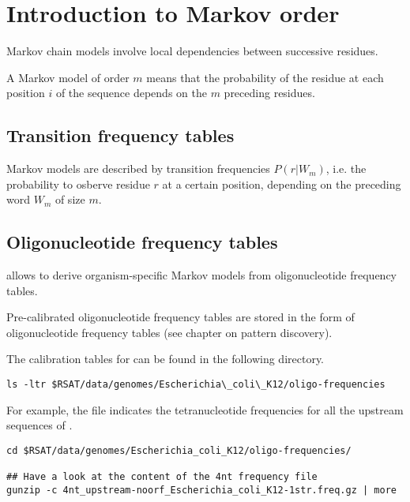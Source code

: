 
\section{Introduction to Markov order}

Markov chain models involve local dependencies between successive
residues.

A Markov model of order $m$ means that the
probability of the residue at each position $i$ of the sequence
depends on the $m$ preceding residues.

\subsection{Transition frequency tables}

Markov models are described by transition frequencies $P(r|W_m)$,
i.e. the probability to osberve residue $r$ at a certain position,
depending on the preceding word $W_m$ of size $m$.

\subsection{Oligonucleotide frequency tables}

\RSAT allows to derive organism-specific Markov models from
oligonucleotide frequency tables.

Pre-calibrated oligonucleotide frequency tables are stored in the form
of oligonucleotide frequency tables (see chapter on pattern
discovery).

The calibration tables for  can be found in the following directory.

\begin{small}
\begin{verbatim}
ls -ltr $RSAT/data/genomes/Escherichia\_coli\_K12/oligo-frequencies
\end{verbatim}
\end{small}

For example, the file
indicates the tetranucleotide frequencies for all the upstream
sequences of .

\begin{small}
\begin{verbatim}
cd $RSAT/data/genomes/Escherichia_coli_K12/oligo-frequencies/

## Have a look at the content of the 4nt frequency file
gunzip -c 4nt_upstream-noorf_Escherichia_coli_K12-1str.freq.gz | more
\end{verbatim}
\end{small}

